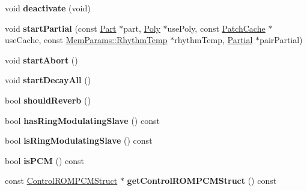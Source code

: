 \begin{DoxyCompactItemize}
\item 
\hypertarget{classMT32Emu_1_1Partial_a3b24766d3398da3da9cec2d27df43b59}{void {\bfseries deactivate} (void)}\label{classMT32Emu_1_1Partial_a3b24766d3398da3da9cec2d27df43b59}

\item 
\hypertarget{classMT32Emu_1_1Partial_afa7687c2c6d1cbc91f351adc1f4348d9}{void {\bfseries start\-Partial} (const \hyperlink{classMT32Emu_1_1Part}{Part} $\ast$part, \hyperlink{classMT32Emu_1_1Poly}{Poly} $\ast$use\-Poly, const \hyperlink{structMT32Emu_1_1PatchCache}{Patch\-Cache} $\ast$use\-Cache, const \hyperlink{structMT32Emu_1_1MemParams_1_1RhythmTemp}{Mem\-Params\-::\-Rhythm\-Temp} $\ast$rhythm\-Temp, \hyperlink{classMT32Emu_1_1Partial}{Partial} $\ast$pair\-Partial)}\label{classMT32Emu_1_1Partial_afa7687c2c6d1cbc91f351adc1f4348d9}

\item 
\hypertarget{classMT32Emu_1_1Partial_afccccff50693629ef1f7cbb6c123a3ea}{void {\bfseries start\-Abort} ()}\label{classMT32Emu_1_1Partial_afccccff50693629ef1f7cbb6c123a3ea}

\item 
\hypertarget{classMT32Emu_1_1Partial_a87f7fa76409f8119f6295514877d056a}{void {\bfseries start\-Decay\-All} ()}\label{classMT32Emu_1_1Partial_a87f7fa76409f8119f6295514877d056a}

\item 
\hypertarget{classMT32Emu_1_1Partial_a0c620050630ff24d90e8316ecbfa1d0e}{bool {\bfseries should\-Reverb} ()}\label{classMT32Emu_1_1Partial_a0c620050630ff24d90e8316ecbfa1d0e}

\item 
\hypertarget{classMT32Emu_1_1Partial_a81348785ad53a4324e295529909d30a1}{bool {\bfseries has\-Ring\-Modulating\-Slave} () const }\label{classMT32Emu_1_1Partial_a81348785ad53a4324e295529909d30a1}

\item 
\hypertarget{classMT32Emu_1_1Partial_a71243503ea655f8c0924e450d112743f}{bool {\bfseries is\-Ring\-Modulating\-Slave} () const }\label{classMT32Emu_1_1Partial_a71243503ea655f8c0924e450d112743f}

\item 
\hypertarget{classMT32Emu_1_1Partial_a65b9dd46e0fb9876aa91f3020410905f}{bool {\bfseries is\-P\-C\-M} () const }\label{classMT32Emu_1_1Partial_a65b9dd46e0fb9876aa91f3020410905f}

\item 
\hypertarget{classMT32Emu_1_1Partial_a4c9c6f517ca1b7b2550463e88dc45016}{const \hyperlink{structMT32Emu_1_1ControlROMPCMStruct}{Control\-R\-O\-M\-P\-C\-M\-Struct} $\ast$ {\bfseries get\-Control\-R\-O\-M\-P\-C\-M\-Struct} () const }\label{classMT32Emu_1_1Partial_a4c9c6f517ca1b7b2550463e88dc45016}


\end{DoxyCompactItemize}

